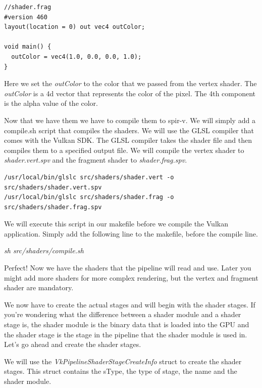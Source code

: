 \documentclass[12pt]{report} \usepackage{preamble}
\begin{document}
\begin{lstlisting}[Language=C++]
//shader.frag
#version 460
layout(location = 0) out vec4 outColor;

void main() {
  outColor = vec4(1.0, 0.0, 0.0, 1.0);
}
\end{lstlisting}

Here we set the \textit{outColor} to the color that we passed from the vertex shader. The \textit{outColor} is a 4d vector
that represents the color of the pixel. The 4th component is the alpha value of the color.

Now that we have them we have to compile them to spir-v. We will simply add a compile.sh script that compiles the shaders. We will
use the \ac{GLSL} compiler that comes with the Vulkan SDK. The \ac{GLSL} compiler takes the shader file and then compiles
them to a specified output file. We will compile the vertex shader to \textit{shader.vert.spv} and the fragment shader to
\textit{shader.frag.spv}.

\begin{lstlisting}[Language=bash]
/usr/local/bin/glslc src/shaders/shader.vert -o src/shaders/shader.vert.spv
/usr/local/bin/glslc src/shaders/shader.frag -o src/shaders/shader.frag.spv
\end{lstlisting}

We will execute this script in our makefile before we compile the Vulkan application.
Simply add the following line to the makefile, before the compile line.

\textit{sh src/shaders/compile.sh}

Perfect! Now we have the shaders that the pipeline will read and use. Later you might add more shaders for more complex
rendering, but the vertex and fragment shader are mandatory.

We now have to create the actual stages and will begin with the shader stages. If you're wondering what the difference
between a shader module and a shader stage is, the shader module is the binary data that is loaded into the \ac{GPU} and the
shader stage is the stage in the pipeline that the shader module is used in. Let's go ahead and create the shader stages.

We will use the \textit{VkPipelineShaderStageCreateInfo} struct to create the shader stages. This struct contains the
sType, the type of stage, the name and the shader module.
\end{document}
